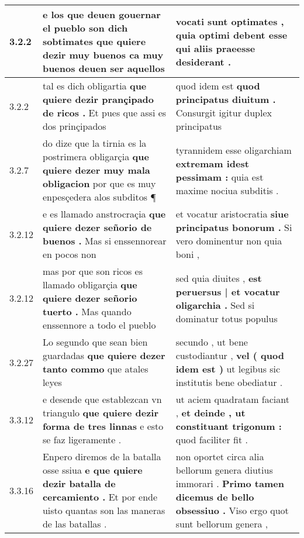 \begin{tabular}{|p{1cm}|p{6.5cm}|p{6.5cm}|}
3.2.2 & e los que deuen gouernar el pueblo son dich sobtimates \textbf{ que quiere dezir muy buenos } ca muy buenos deuen ser aquellos & vocati sunt optimates , \textbf{ quia optimi debent esse } qui aliis praeesse desiderant . \\\hline
3.2.2 & tal es dich obligartia \textbf{ que quiere dezir prançipado de ricos . } Et pues que assi es dos prinçipados & quod idem est \textbf{ quod principatus diuitum . } Consurgit igitur duplex principatus \\\hline
3.2.7 & do dize que la tirnia es la postrimera obligarçia \textbf{ que quiere dezer muy mala obligacion } por que es muy enpesçedera alos subditos ¶ & tyrannidem esse oligarchiam \textbf{ extremam idest pessimam : } quia est maxime nociua subditis . \\\hline
3.2.12 & e es llamado anstrocraçia \textbf{ que quiere dezer señorio de buenos . } Mas si enssennorear en pocos non & et vocatur aristocratia \textbf{ siue principatus bonorum . } Si vero dominentur non quia boni , \\\hline
3.2.12 & mas por que son ricos es llamado obligarçia \textbf{ que quiere dezer señorio tuerto . } Mas quando enssennore a todo el pueblo & sed quia diuites , \textbf{ est peruersus | et vocatur oligarchia . } Sed si dominatur totus populus \\\hline
3.2.27 & Lo segundo que sean bien guardadas \textbf{ que quiere dezer tanto commo } que atales leyes & secundo , ut bene custodiantur , \textbf{ vel ( quod idem est ) } ut legibus sic institutis bene obediatur . \\\hline
3.3.12 & e desende que establezcan vn triangulo \textbf{ que quiere dezir forma de tres linnas } e esto se faz ligeramente . & ut aciem quadratam faciant , \textbf{ et deinde , ut constituant trigonum : } quod faciliter fit . \\\hline
3.3.16 & Enpero diremos de la batalla osse ssiua \textbf{ e que quiere dezir batalla de cercamiento . } Et por ende uisto quantas son las maneras de las batallas . & non oportet circa alia bellorum genera diutius immorari . \textbf{ Primo tamen dicemus de bello obsessiuo . } Viso ergo quot sunt bellorum genera , \\\hline

\end{tabular}

